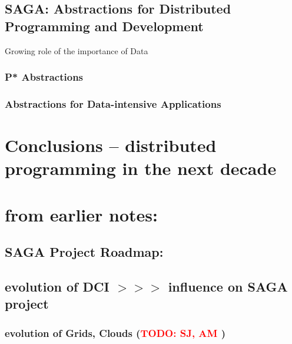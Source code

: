\documentclass{article}
\newcommand{\B}[1]{\textbf{#1}}
\newcommand{\todo}[1]{{\textcolor{red}{\B{TODO:} #1 }}}
\newcommand{\hknote}[1]{{\textcolor{red}{  \B{Hartmut: } #1 }}}
\newcommand{\hknote}[1]{}
\begin{document}




\subsection{SAGA: Abstractions for Distributed Programming and
  Development}

 Growing role of the importance of Data


\subsubsection{P* Abstractions}

\subsubsection{Abstractions for Data-intensive Applications}


\section{Conclusions -- distributed programming in the next decade}
\label{sec:sum}


\newpage

\section{\B{from earlier notes:}}


 \subsection{ SAGA Project Roadmap:}


 \subsection{ evolution of DCI $>>>$ influence on SAGA project}
 \subsubsection{ evolution of Grids, Clouds (\todo{SJ, AM})}
\end{document}
